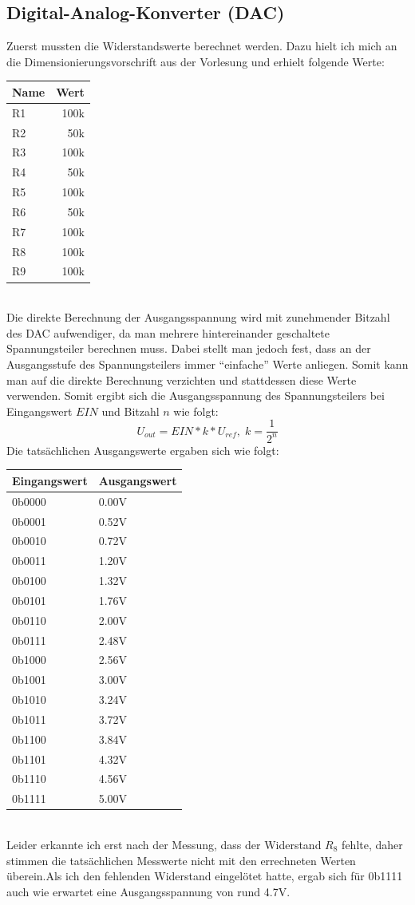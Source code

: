 \setcounter{section}{9}
\subsection{Digital-Analog-Konverter (DAC)}
Zuerst mussten die Widerstandswerte berechnet werden. Dazu hielt ich mich an die Dimensionierungsvorschrift aus der Vorlesung und erhielt folgende Werte:\\
\begin{tabular}{l|r}
	Name & Wert\\
	\hline
	R1 & 100k\\
	R2 & 50k\\
	R3 & 100k\\
	R4 & 50k\\
	R5 & 100k\\
	R6 & 50k\\
	R7 & 100k\\
	R8 & 100k\\
	R9 & 100k\\
\end{tabular}\\
Die direkte Berechnung der Ausgangsspannung wird mit zunehmender Bitzahl des DAC aufwendiger, da man mehrere hintereinander geschaltete Spannungsteiler berechnen muss. Dabei stellt man jedoch fest, dass an der Ausgangsstufe des Spannungsteilers immer "`einfache"' Werte anliegen. Somit kann man auf die direkte Berechnung verzichten und stattdessen diese Werte verwenden. Somit ergibt sich die Ausgangsspannung des Spannungsteilers bei Eingangswert $EIN$ und Bitzahl $n$ wie folgt:
\[ U_{out} = EIN * k * U_{ref},\; k=\frac{1}{2^n} \]
Die tatsächlichen Ausgangswerte ergaben sich wie folgt:\\
\begin{tabular}{l|l}
	Eingangswert & Ausgangswert\\
	\hline
	0b0000 & 0.00V\\
	0b0001 & 0.52V\\
	0b0010 & 0.72V\\
	0b0011 & 1.20V\\
	0b0100 & 1.32V\\
	0b0101 & 1.76V\\
	0b0110 & 2.00V\\
	0b0111 & 2.48V\\
	0b1000 & 2.56V\\
	0b1001 & 3.00V\\
	0b1010 & 3.24V\\
	0b1011 & 3.72V\\
	0b1100 & 3.84V\\
	0b1101 & 4.32V\\
	0b1110 & 4.56V\\
	0b1111 & 5.00V\\
\end{tabular}\\
Leider erkannte ich erst nach der Messung, dass der Widerstand $R_8$ fehlte, daher stimmen die tatsächlichen Messwerte nicht mit den errechneten Werten überein.Als ich den fehlenden Widerstand eingelötet hatte, ergab sich für 0b1111 auch wie erwartet eine Ausgangsspannung von rund 4.7V.

